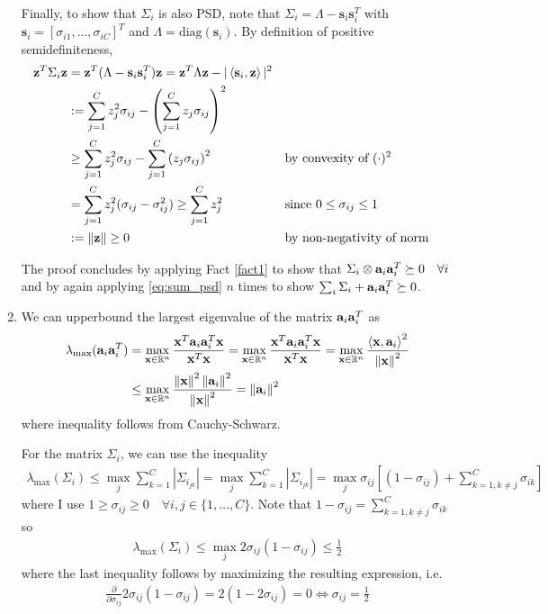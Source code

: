\documentclass{article}
\begin{document}
\begin{enumerate}[label=1.I.\arabic*]
    Finally, to show that $\Sigma_i$ is also PSD, note that $\Sigma_i = \Lambda - \mathbf{s}_i \mathbf{s}_i^T $ with $\mathbf{s}_i =[\sigma_{i1},\dots, \sigma_{iC}]^T$ and $\Lambda=\text{diag}(\mathbf{s}_i)$. By definition of positive semidefiniteness,
    \begin{align}
        \zz^T \Sigma_i \zz &= \zz^T (\Lambda - \mathbf{s}_i \mathbf{s}_i^T)\zz = \zz^T \Lambda \zz - |\lin{\mathbf{s}_i, \zz}|^2 \\
        &:= \sum_{j=1}^{C} z_j^2 \sigma_{ij} - \left(\sum_{j=1}^{C} z_j \sigma_{ij}\right)^2 \\
        &\geq \sum_{j=1}^{C} z_j^2 \sigma_{ij} - \sum_{j=1}^{C} \left( z_j \sigma_{ij}\right)^2 &&\text{by convexity of $(\cdot)^2$}\\
        &= \sum_{j=1}^{C} z_j^2 (\sigma_{ij} - \sigma_{ij}^2) \geq \sum_{j=1}^{C} z_j^2 &&\text{since $0\leq \sigma_{ij} \leq 1$}\\
        &:= \norm{\zz} \geq 0 &&\text{by non-negativity of norm}
    \end{align}
    
    The proof concludes by applying Fact \ref{fact1} to show that $\Sigma_i \otimes \aa_i \aa_i^T \succeq 0 \quad \forall i$ and by again applying \eqref{eq:sum_psd} $n$ times to show $\sum_i \Sigma_i + \aa_i \aa_i^T \succeq 0$.
    \item We can upperbound the largest eigenvalue of the matrix $\aa_i \aa_i^T$ as
    \begin{align}
        \lambda_{\max} (\aa_i \aa_i^T) &= \max_{\xx \in \R^n} \frac{\xx^T \aa_i \aa_i^T \xx}{\xx^T \xx} = \max_{\xx \in \R^n}\frac{\xx^T \aa_i \aa_i^T \xx}{\xx^T \xx} = \max_{\xx \in \R^n}\frac{\lin{\xx, \aa_i}^2}{\norm{\xx}^2} \\
        &\leq \max_{\xx \in \R^n} \frac{\norm{\xx}^2 \norm{\aa_i}^2}{\norm{\xx}^2}  = \norm{\aa_i}^2
    \end{align}
    where inequality follows from Cauchy-Schwarz.
    
    For the matrix $\Sigma_i$, we can use the inequality
    \begin{align}
        \lambda_{\max} (\Sigma_i) \leq \max_j \sum_{k=1}^C |\Sigma_{i_{jk}}| = \max_j \sum_{k=1}^C |\Sigma_{i_{jk}}| = \max_j \sigma_{ij} \left[(1-\sigma_{ij})+\sum_{k=1, k\neq j}^C \sigma_{ik} \right]
    \end{align}
    where I use $1 \geq \sigma_{ij} \geq 0 \quad \forall i,j \in \{1,\dots, C\}$. Note that $1-\sigma_{ij}=\sum_{k=1, k\neq j}^C \sigma_{ik}$ so
    \begin{align}
        \lambda_{\max} (\Sigma_i) \leq \max_j 2 \sigma_{ij} (1-\sigma_{ij}) \leq \frac{1}{2}
    \end{align}
    where the last inequality follows by maximizing the resulting expression, i.e.
    \begin{align}
        \frac{\partial}{\partial \sigma_{ij}} 2 \sigma_{ij} (1-\sigma_{ij}) = 2(1- 2 \sigma_{ij}) = 0 \Longleftrightarrow \sigma_{ij} = \frac{1}{2}
    \end{align}
    

\end{enumerate}
\end{document}
